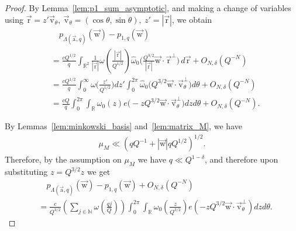 \documentclass[letterpaper,11pt]{amsart}
\numberwithin{equation}{section}
\theoremstyle{definition}
\numberwithin{equation}{section}
\newcommand{\RR}{\mathbb{R}}
\renewcommand{\hat}{\widehat}
\newcommand{\ux}{{\vec{\mathrm{x}}}}
\newcommand{\ua}{\vec{\mathrm{a}}}
\newcommand{\ur}{\vec{\mathrm{r}}}
\newcommand{\uw}{{\vec{\mathrm{w}}}}
\newcommand{\uv}{{\vec{\mathrm{v}}}}
\renewcommand{\hat}{\widehat}
\newcommand{\N}{\mathbb{N}}
\newcommand{\R}{\mathbb{R}}
\begin{document}
\begin{proof}
By Lemma~\ref{lem:p1_sum_asymptotic}, and making a change of variables using \(\ur=z'\uv_{\theta}, \ \uv_{\theta}=(\cos \theta, \sin \theta),\  z'=|\ur|\), we obtain
	\begin{align*}
		&\quad p_{\Lambda(\ua, q)}(\uw)-
		p_{1,q}(\uw)\\&=\frac{cQ^{1/2}}{q}
	\int_{\R^2}\frac{1}{|\ur|}
	\omega\left(
	\frac{ |\ur| }{ Q^{1/2}}
	\right)
	\hat{\omega}_0
	\Big(
	\frac{Q^{3/2}}{|\ur|} \uw\cdot\ur^\perp
	\Big)\,d\ur
	+O_{N,\delta}(Q^{-N})\\
    &=\frac{cQ^{1/2}}{q}\int_{0}^\infty \omega\Big(\frac{z'}{Q^{1/2}}\Big) dz' \int_{0}^{2\pi}\hat{\omega}_0\Big(
     Q^{3/2}\uw \cdot \uv_{\theta}^\perp \Big)d\theta+O_{N, \delta}(Q^{-N})\\
     &=\frac{cQ}{q}\int_{0}^{2\pi}\int_{\RR}\omega_0(z)e\Big(-zQ^{3/2}\uw 
     \cdot \uv_{\theta}^\perp\Big)dz d\theta +O_{N, \delta}(Q^{-N}).
    \end{align*}

By Lemmas~\ref{lem:minkowski_basis} and~\ref{lem:matrix_M}, we have 
\begin{align}\label{muM}
\mu_M \ll (qQ^{-1}+|\uw|qQ^{1/2})^{1/2}.
\end{align} Therefore, by the assumption on \(\mu_M\) we have
	 \(q\ll Q^{1-\delta}\), and therefore upon substituting  \(z=Q^{3/2}z\) we get 
	\begin{align*}
		&\quad p_{\Lambda(\ua, q)}(\uw)-
		p_{1,q}(\uw)+O_{N,\delta}(Q^{-N})
		\\&=
		\frac{c}{Q^{3/2}}
		\left(\sum_{j\in\N} \omega\left(\frac{qj}{Q}\right)\right)
		\int_{0}^{2\pi}\int_{\RR}
		{\omega}_0\left(\frac{z}{Q^{3/2}}\right)
		e\left(-zQ^{3/2}\uw\cdot \uv_\theta^\perp\right)dzd\theta
		.
	\end{align*}
    

\end{proof}
\end{document}
